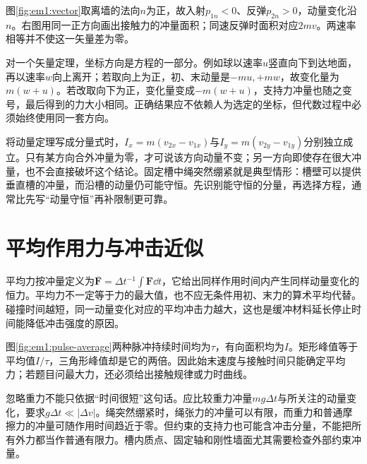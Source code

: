图\ref{fig:em1:vector}取离墙的法向$n$为正，故入射$p_{1n}<0$、反弹$p_{2n}>0$，动量变化沿$n$。右图用同一正方向画出接触力的冲量面积；同速反弹时面积对应$2mv$。两速率相等并不使这一矢量差为零。


对一个矢量定理，坐标方向是方程的一部分。例如球以速率$u$竖直向下到达地面，再以速率$w$向上离开；若取向上为正，初、末动量是$-mu,+mw$，故变化量为$m(w+u)$。若改取向下为正，变化量变成$-m(w+u)$，支持力冲量也随之变号，最后得到的力大小相同。正确结果应不依赖人为选定的坐标，但代数过程中必须始终使用同一套方向。

将动量定理写成分量式时，$I_x=m(v_{2x}-v_{1x})$与$I_y=m(v_{2y}-v_{1y})$分别独立成立。只有某方向合外冲量为零，才可说该方向动量不变；另一方向即使存在很大冲量，也不会直接破坏这个结论。固定槽中绳突然绷紧就是典型情形：槽壁可以提供垂直槽的冲量，而沿槽的动量仍可能守恒。先识别能守恒的分量，再选择方程，通常比先写“动量守恒”再补限制更可靠。

\section{平均作用力与冲击近似}

平均力按冲量定义为$\overline{\bm F}=\Delta t^{-1}\int\bm F\dd t$，它给出同样作用时间内产生同样动量变化的恒力。平均力不一定等于力的最大值，也不应无条件用初、末力的算术平均代替。碰撞时间越短，同一动量变化对应的平均冲击力越大，这也是缓冲材料延长停止时间能降低冲击强度的原因。

图\ref{fig:em1:pulse-average}两种脉冲持续时间均为$\tau$，有向面积均为$I$。矩形峰值等于平均值$I/\tau$，三角形峰值却是它的两倍。因此始末速度与接触时间只能确定平均力；若题目问最大力，还必须给出接触规律或力时曲线。


忽略重力不能只依据“时间很短”这句话。应比较重力冲量$mg\Delta t$与所关注的动量变化，要求$g\Delta t\ll |\Delta v|$。绳突然绷紧时，绳张力的冲量可以有限，而重力和普通摩擦力的冲量可随作用时间趋近于零。但约束的支持力也可能含冲击分量，不能把所有外力都当作普通有限力。槽内质点、固定轴和刚性墙面尤其需要检查外部约束冲量。

